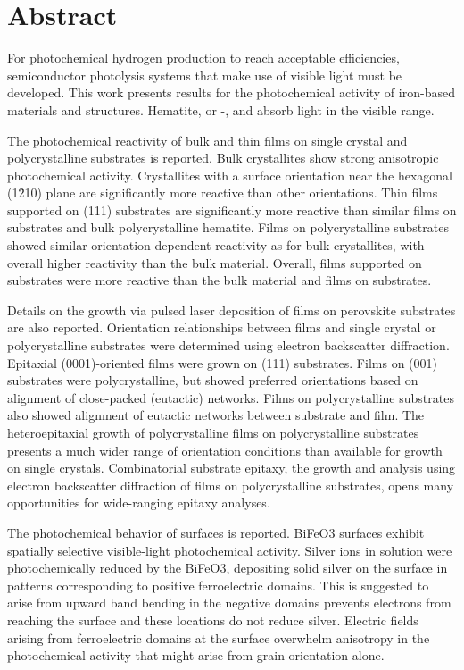 \chapter{Abstract}

For photochemical hydrogen production to reach acceptable efficiencies, semiconductor photolysis systems that make use of visible light must be developed. This work presents results for the photochemical activity of iron-based materials and structures. Hematite, or \textalpha-, and  absorb light in the visible range. 

The photochemical reactivity of bulk  and thin  films on single crystal and polycrystalline substrates is reported. Bulk  crystallites show strong anisotropic photochemical activity. Crystallites with a surface orientation near the hexagonal (1\={2}10) plane are significantly more reactive than other orientations. Thin  films supported on  (111) substrates are significantly more reactive than similar films on  substrates and bulk polycrystalline hematite. Films on polycrystalline substrates showed similar orientation dependent reactivity as for bulk  crystallites, with overall higher reactivity than the bulk material. Overall, films supported on  substrates were more reactive than the bulk material and films on  substrates.

Details on the growth via pulsed laser deposition of  films on perovskite  substrates are also reported. Orientation relationships between films and single crystal or polycrystalline substrates were determined using electron backscatter diffraction. Epitaxial (0001)-oriented films were grown on  (111) substrates. Films on  (001) substrates were polycrystalline, but showed preferred orientations based on alignment of close-packed (eutactic) networks. Films on polycrystalline  substrates also showed alignment of eutactic networks between substrate and film. The heteroepitaxial growth of polycrystalline films on polycrystalline substrates presents a much wider range of orientation conditions than available for growth on single crystals. Combinatorial substrate epitaxy, the growth and analysis using electron backscatter diffraction of films on polycrystalline substrates, opens many opportunities for wide-ranging epitaxy analyses.

The photochemical behavior of  surfaces is reported. BiFeO3 surfaces exhibit spatially selective visible-light photochemical activity. Silver ions in solution were photochemically reduced by the BiFeO3, depositing solid silver on the surface in patterns corresponding to positive ferroelectric domains. This is suggested to arise from upward band bending in the negative domains prevents electrons from reaching the surface and these locations do not reduce silver. Electric fields arising from ferroelectric domains at the surface overwhelm anisotropy in the photochemical activity that might arise from grain orientation alone.